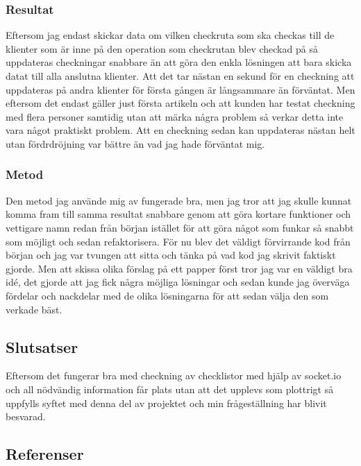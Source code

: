 \subsubsection{Resultat}
Eftersom jag endast skickar data om vilken checkruta som ska checkas till de klienter som är inne på den operation som checkrutan blev checkad på så uppdateras checkningar snabbare än att göra den enkla lösningen att bara skicka datat till alla anslutna klienter. Att det tar nästan en sekund för en checkning att uppdateras på andra klienter för första gången är långsammare än förväntat. Men eftersom det endast gäller just första artikeln och att kunden har testat checkning med flera personer samtidig utan att märka några problem så verkar detta inte vara något praktiskt problem. Att en checkning sedan kan uppdateras nästan helt utan fördrdröjning var bättre än vad jag hade förväntat mig.

\subsubsection{Metod}
Den metod jag använde mig av fungerade bra, men jag tror att jag skulle kunnat komma fram till samma resultat snabbare genom att göra kortare funktioner och vettigare namn redan från början istället för att göra något som funkar så snabbt som möjligt och sedan refaktorisera. För nu blev det väldigt förvirrande kod från början och jag var tvungen att sitta och tänka på vad kod jag skrivit faktiskt gjorde. Men att skissa olika förslag på ett papper först tror jag var en väldigt bra idé, det gjorde att jag fick några möjliga lösningar och sedan kunde jag överväga fördelar och nackdelar med de olika lösningarna för att sedan välja den som verkade bäst.

\subsection{Slutsatser}
Eftersom det fungerar bra med checkning av checklistor med hjälp av socket.io och all nödvändig information får plats utan att det upplevs som plottrigt så uppfylls syftet med denna del av projektet och min frågeställning har blivit besvarad.

\subsection{Referenser}
\vspace{-9mm}
\begin{thebibliography}{9}

\end{thebibliography}